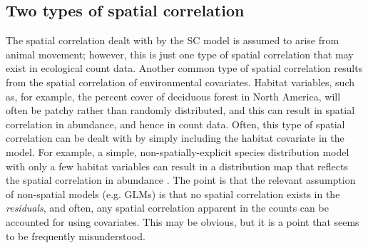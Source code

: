\subsection{Two types of spatial correlation}

The spatial correlation dealt with by the SC model is assumed to arise
from animal movement; however, this is just one type of spatial
correlation that may exist in ecological count data. Another common
type of spatial correlation results from the spatial correlation of
environmental covariates. Habitat variables, such as, for example, the percent cover
of deciduous forest in North America, will often be patchy rather than randomly
distributed, and this can result in spatial correlation in abundance,
and hence in count data.  %
Often, this type of spatial correlation can be dealt with by simply including
the habitat covariate in the model. For example, a simple, non-spatially-explicit
species distribution model with only a few habitat variables can result in a
distribution map that reflects the spatial correlation in abundance
\citep{sillett_etal:2012,royle_etal:2012mee2}. %
The point is that the %
relevant assumption of non-spatial models (e.g. GLMs) is that
no spatial correlation exists in the \textit{residuals}, and often,
any spatial correlation apparent in the counts can be accounted for using
covariates. This may be obvious, but
it is a point that seems to be frequently misunderstood.

